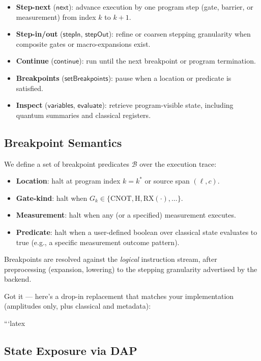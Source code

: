 \documentclass[12pt]{article}
\begin{document}
\begin{itemize}
  \item \textbf{Step-next} ($\mathsf{next}$): advance execution by one program step (gate, barrier, or measurement) from index $k$ to $k{+}1$.
  \item \textbf{Step-in/out} ($\mathsf{stepIn}$, $\mathsf{stepOut}$): refine or coarsen stepping granularity when composite gates or macro-expansions exist.
  \item \textbf{Continue} ($\mathsf{continue}$): run until the next breakpoint or program termination.
  \item \textbf{Breakpoints} ($\mathsf{setBreakpoints}$): pause when a location or predicate is satisfied.
  \item \textbf{Inspect} ($\mathsf{variables}$, $\mathsf{evaluate}$): retrieve program-visible state, including quantum summaries and classical registers.
\end{itemize}


\subsection{Breakpoint Semantics}

We define a set of breakpoint predicates $\mathcal{B}$ over the execution trace:
\begin{itemize}
  \item \textbf{Location}: halt at program index $k = k^\ast$ or source span $(\ell, c)$.
  \item \textbf{Gate-kind}: halt when $G_k \in \{\mathrm{CNOT}, \mathrm{H}, \mathrm{RX}(\cdot), \ldots\}$.
  \item \textbf{Measurement}: halt when any (or a specified) measurement executes.
  \item \textbf{Predicate}: halt when a user-defined boolean over classical state evaluates to true (e.g., a specific measurement outcome pattern).
\end{itemize}
Breakpoints are resolved against the \emph{logical} instruction stream, after preprocessing (expansion, lowering) to the stepping granularity advertised by the backend.


Got it — here’s a drop-in replacement that matches your implementation (amplitudes only, plus classical and metadata):

```latex
\subsection{State Exposure via DAP}
\end{document}
